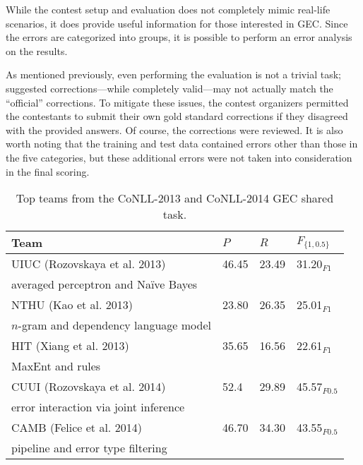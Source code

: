 While the contest setup and evaluation does not completely mimic real-life
scenarios, it does provide useful information for those interested in GEC\@.
Since the errors are categorized into groups, it is possible to perform an error
analysis on the results.

As mentioned previously, even performing the evaluation is not a trivial task;
suggested corrections---while completely valid---may not actually match the
``official'' corrections. To mitigate these issues, the contest organizers
permitted the contestants to submit their own gold standard corrections if they
disagreed with the provided answers. Of course, the corrections were reviewed.
It is also worth noting that the training and test data contained errors other
than those in the five categories, but these additional errors were not taken
into consideration in the final scoring.

\begin{table}[t]
  \begin{center}
      \begin{tabular}{llll}
       \hline
       \hline
       \textbf{Team} & $P$ & $R$ & $F_{\{1,0.5\}}$\\
       \hline
       \hline
       UIUC (Rozovskaya et al. 2013)& 46.45 & 23.49 & 31.20$_{F1}$ \\
       \hspace{.1in}averaged perceptron and Na\"ive Bayes & & &\\
       \hline
       NTHU (Kao et al. 2013)& 23.80 & 26.35 & 25.01$_{F1}$ \\
       \hspace{.1in}$n$-gram and dependency language model & & & \\
       \hline
       HIT (Xiang et al. 2013)& 35.65 & 16.56 & 22.61$_{F1}$ \\
       \hspace{.1in}MaxEnt and rules & & & \\
       \hline
       \hline
       CUUI (Rozovskaya et al. 2014) & 52.4 & 29.89 & 45.57$_{F0.5}$\\
       \hspace{.1in} error interaction via joint inference & & & \\
       \hline
       CAMB (Felice et al. 2014) & 46.70 & 34.30 & 43.55$_{F0.5}$\\
       \hspace{.1in} pipeline and error type filtering & & & \\
       \hline
       \hline
      \end{tabular}
  \end{center}
      \caption{Top teams from the CoNLL-2013 and CoNLL-2014 GEC shared task.}
      \label{table:grammar-comp}
\end{table}

